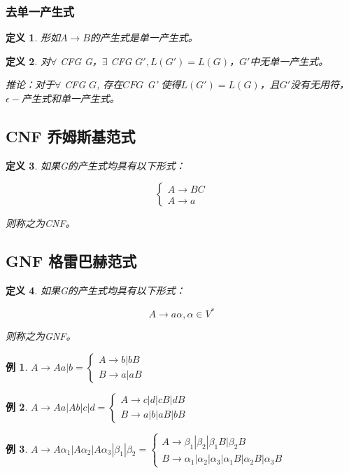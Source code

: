 \documentclass{ctexart}
\newtheorem{definition}{定义}[section]
\newtheorem{example}{例}[section]
\begin{document}
\subsubsection{去单一产生式}
\begin{definition}
    形如$A \to B$的产生式是单一产生式。
\end{definition}
\begin{definition}
    对$\forall$ CFG G，$\exists$ CFG $G', L(G') = L(G)$，$G'$中无单一产生式。

    推论：对于$\forall$ CFG $G$, 存在$CFG$ G' 使得$L(G') = L(G)$，且$G'$没有无用符，$\epsilon -$产生式和单一产生式。
\end{definition}

\subsection{CNF 乔姆斯基范式}
\begin{definition}
    如果G的产生式均具有以下形式：
    
    $$
    \begin{cases}
        A \to BC \\
        A \to a
    \end{cases}
    $$

    则称之为CNF。
\end{definition}
\subsection{GNF 格雷巴赫范式}
\begin{definition}
    如果G的产生式均具有以下形式：
    
    $$
        A \to a\alpha, \alpha \in V^*
    $$

    则称之为GNF。
\end{definition}

\begin{example}
    $A \to Aa | b = \begin{cases}
        A \to b | bB \\
        B \to a | aB
    \end{cases}$
\end{example}

\begin{example}
    $A \to Aa | Ab | c | d = \begin{cases}
        A \to c | d | cB | dB \\
        B \to a | b | aB | bB
    \end{cases}$
\end{example}
\begin{example}
    $
        A \to  A\alpha_1 | A\alpha_2 | A\alpha_3 | \beta_1 | \beta_2 
        = \begin{cases}
            A \to \beta_1 | \beta_2 | \beta_1B | \beta_2B \\
            B \to \alpha_1 | \alpha_2  | \alpha_3 | \alpha_1B | \alpha_2B | \alpha_3B
        \end{cases}
    $
\end{example}
\end{document}
